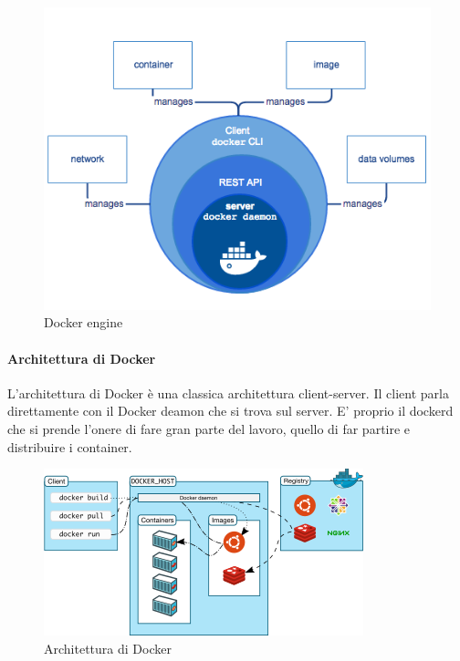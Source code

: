 \begin{figure}[h!]
	\centering
	\includegraphics[width=\textwidth,keepaspectratio=true]{capitoli/imgs/dockerThinking.png}
	\caption{Docker engine}
\end{figure}

\paragraph{Architettura di Docker}
L'architettura di Docker è una classica architettura client-server. Il client parla direttamente con il Docker deamon che si trova sul server. E' proprio il dockerd che si prende l'onere di fare gran parte del lavoro, quello di far partire e distribuire i container.
\begin{figure}[h!]
	\centering
	\includegraphics[width=\textwidth,keepaspectratio=true]{capitoli/imgs/architecturedocker.png}
	\caption{Architettura di Docker}
\end{figure}
